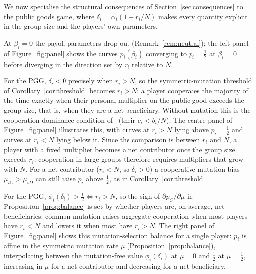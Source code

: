 \documentclass[11pt]{article}
\newcommand{\pC}{p_C}
\begin{document}
We now specialise the structural consequences of Section~\ref{sec:consequences} to the
public goods game, where \(\delta_i=\alpha_i(1-r_i/N)\) makes every quantity explicit in
the group size and the players' own parameters.

At \(\beta_i=0\) the payoff parameters drop out
(Remark~\ref{rem:neutral}); the left panel of Figure~\ref{fig:panel} shows the
curves \(p_i(\beta_i)\) converging to \(p_i=\tfrac{1}{2}\) at \(\beta_i=0\)
before diverging in the direction set by \(r_i\) relative to \(N\).

For the PGG, \(\delta_i<0\) precisely when \(r_i>N\), so
the symmetric-mutation threshold of Corollary~\ref{cor:threshold} becomes \(r_i>N\): a
player cooperates the majority of the time exactly when their personal multiplier on the
public good exceeds the group size, that is, when they are a net beneficiary.
Without mutation this is the cooperation-dominance condition
of~\cite{couto2023multiplayer} (their \(c_i<b_i/N\)). The centre panel of
Figure~\ref{fig:panel} illustrates this, with curves at \(r_i>N\) lying above
\(p_i=\tfrac{1}{2}\) and curves at \(r_i<N\) lying below it. Since the comparison is
between \(r_i\) and \(N\), a player with a fixed multiplier becomes a net contributor
once the group size exceeds \(r_i\): cooperation in large groups therefore requires
multipliers that grow with \(N\). For a net contributor (\(r_i<N\), so
\(\delta_i>0\)) a cooperative mutation bias \(\mu_{iC}>\mu_{iD}\) can still raise
\(p_i\) above \(\tfrac{1}{2}\), as in Corollary~\ref{cor:threshold}.

For the PGG, \(\phi_i(\delta_i)>\tfrac{1}{2}\iff r_i>N\), so the sign of
\(\partial\pC/\partial\mu\) in Proposition~\ref{prop:balance} is set by
whether players are, on average, net beneficiaries: common mutation raises
aggregate cooperation when most players have \(r_i<N\) and lowers it when most have
\(r_i>N\). The right panel of Figure~\ref{fig:panel} shows this mutation-selection
balance for a single player: \(p_i\) is affine in the symmetric mutation rate \(\mu\)
(Proposition~\ref{prop:balance}), interpolating between the mutation-free value
\(\phi_i(\delta_i)\) at \(\mu=0\) and \(\tfrac{1}{2}\) at \(\mu=\tfrac{1}{2}\),
increasing in \(\mu\) for a net contributor and decreasing for a net beneficiary.
\end{document}
